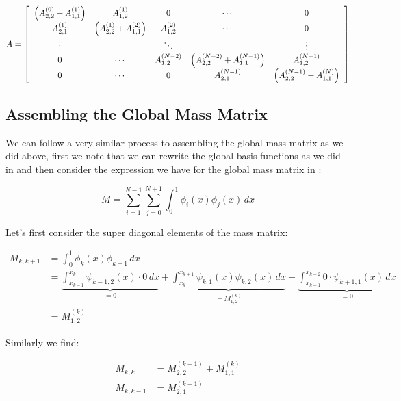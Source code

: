 \begin{equation}\label{eq:oned-deterministic-global-stiffness}
    A = \left[\begin{array}{c c c c c}
         \left(A^{(0)}_{2,2} + A^{(1)}_{1,1}\right) & A^{(1)}_{1,2} & 0 & \cdots & 0 \\
         A^{(1)}_{2,1} & \left(A^{(1)}_{2,2} + A^{(2)}_{1,1}\right) & A^{(2)}_{1,2} & \cdots & 0 \\
         \vdots & & \ddots  & & \vdots \\
         0 & \cdots & A^{(N-2)}_{1,2} & \left(A^{(N-2)}_{2,2} + A^{(N-1)}_{1,1}\right)& A^{(N-1)}_{1,2} \\
         0 & \cdots & 0 & A^{(N-1)}_{2,1} & \left(A^{(N-1)}_{2,2} + A^{(N)}_{1,1}\right)
        \end{array}\right]
\end{equation}

\subsection{Assembling the Global Mass Matrix}

We can follow a very similar process to assembling the global mass matrix as we
did above, first we note that we can rewrite the global basis functions as we
did in  and then consider the
expression we have for the global mass matrix in
:

\[
    M = \sum_{i=1}^{N-1}\sum_{j=0}^{N+1}\int_0^1\phi_i(x)\phi_j(x)\, dx
\]

Let's first consider the super diagonal elements of the mass matrix:

\begin{align*}
    M_{k,k+1} &= \int_0^1\phi_k(x)\phi_{k+1}\, dx \\
              &= \underbrace{\int_{x_{k-1}}^{x_k}\psi_{k-1,2}(x) \cdot 0\, dx}_{ = 0}
               + \underbrace{\int_{x_k}^{x_{k+1}}\psi_{k,1}(x)\psi_{k,2}(x)\, dx}_{= M^{(k)}_{1,2}}
               + \underbrace{\int_{x_{k+1}}^{x_{k+2}}0 \cdot \psi_{k+1,1}(x)\, dx}_{= 0} \\
              &= M^{(k)}_{1,2}
\end{align*}

Similarly we find:

\begin{align*}
    M_{k,k} &= M^{(k-1)}_{2,2} + M^{(k)}_{1,1} \\
    M_{k,k-1} &= M^{(k-1)}_{2,1}
\end{align*}


